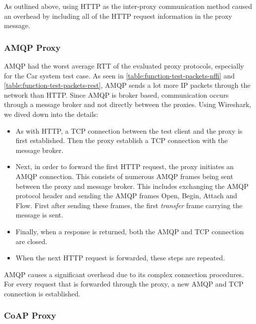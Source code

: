 As outlined above, using HTTP as the inter-proxy communication method caused an
overhead by including all of the HTTP request information in the proxy message.

\subsubsection{AMQP Proxy}

AMQP had the worst average RTT of the evaluated proxy protocols, especially for
the Car system test case. As seen in \cref{table:function-test-packets-nffi} and
\cref{table:function-test-packets-rest}, AMQP sends a lot more IP packets through
the network than HTTP. Since AMQP is broker based, communication occurs through a
message broker and not directly between the proxies. Using Wireshark, we dived
down into the details:

\begin{itemize}

	\item As with HTTP, a TCP connection between the test client and the
	proxy is first established. Then the proxy establish a TCP connection with the
	message broker.

	 \item Next, in order to forward the first HTTP request, the proxy initiates
	 an AMQP connection. This consists of numerous AMQP frames being sent between
	 the proxy and message broker. This includes exchanging the AMQP protocol
	 header and sending the AMQP frames Open, Begin, Attach and Flow.  First after
	 sending these frames, the first \textit{transfer} frame carrying the
	 message is sent.

     \item Finally, when a response is returned, both the AMQP and TCP connection
     are closed.

     \item When the next HTTP request is forwarded, these steps are repeated.

\end{itemize}

AMQP causes a significant overhead due to its complex connection procedures. For
every request that is forwarded through the proxy, a new AMQP and TCP connection
is established.

\subsubsection{CoAP Proxy}

